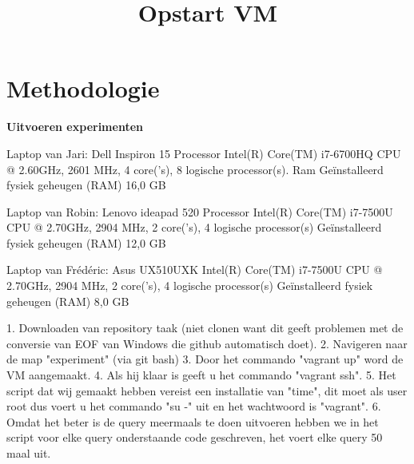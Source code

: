 \documentclass[fleqn,10pt]{artikeltin}
\begin{document}
\section{Methodologie}
\label{sec:methodologie}

\textbf{Uitvoeren experimenten}

Laptop van Jari: Dell Inspiron 15 
Processor Intel(R) Core(TM) i7-6700HQ CPU @ 2.60GHz, 2601 MHz, 4 core('s), 8 logische processor(s). 
Ram Geïnstalleerd fysiek geheugen (RAM)	16,0 GB

Laptop van Robin: Lenovo ideapad 520
Processor	Intel(R) Core(TM) i7-7500U CPU @ 2.70GHz, 2904 MHz, 2 core('s), 4 logische processor(s)
Geïnstalleerd fysiek geheugen (RAM)	12,0 GB

Laptop van Frédéric: Asus UX510UXK
Intel(R) Core(TM) i7-7500U CPU @ 2.70GHz, 2904 MHz, 2 core('s), 4 logische processor(s)
Geïnstalleerd fysiek geheugen (RAM)	8,0 GB

\title{Opstart VM}

1. Downloaden van repository taak (niet clonen want dit geeft problemen met de conversie van EOF van Windows die github automatisch doet).
2. Navigeren naar de map "experiment" (via git bash)
3. Door het commando "vagrant up" word de VM aangemaakt.
4. Als hij klaar is geeft u het commando "vagrant ssh".
5. Het script dat wij gemaakt hebben vereist een installatie van "time", dit moet als user root dus voert u het commando "su -" uit en het wachtwoord is "vagrant".
6. Omdat het beter is de query meermaals te doen uitvoeren hebben we in het script voor elke query onderstaande code geschreven, het voert elke query 50 maal uit.
\end{document}
